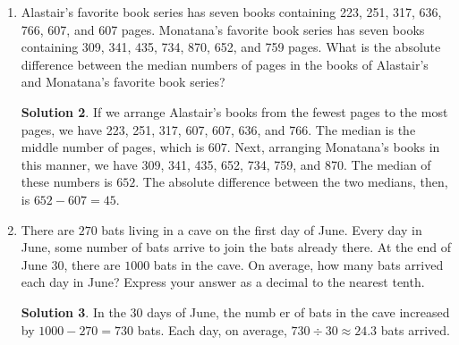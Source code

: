 \documentclass{article}
\theoremstyle{definition}
\newtheorem*{solution}{Solution}
\begin{document}
\begin{enumerate}
\begin{solution}
            there are $\frac{7\cdot6}{2} = 21$ different partnerships possible. The
            probaility is $\frac{12}{21}$.
        \end{solution}
        \item Alastair's favorite book series has seven books containing 223, 251, 317, 
        636, 766, 607, and 607 pages. Monatana's favorite book series has seven books 
        containing 309, 341, 435, 734, 870, 652, and 759 pages. What is the absolute
        difference between the median numbers of pages in the books of Alastair's and
        Monatana's favorite book series?
        \begin{solution}
            If we arrange Alastair's books from the fewest pages to the most pages, we
            have 223, 251, 317, 607, 607, 636, and 766. The median is the middle number of
            pages, which is $607$. Next, arranging Monatana's books in this manner, we have
            309, 341, 435, 652, 734, 759, and 870. The median of these numbers is $652$.
            The absolute difference between the two medians, then, is $652 - 607 = 45$.
        \end{solution}
        \item There are $270$ bats living in a cave on the first day of June. Every day in
        June, some number of bats arrive to join the bats already there. At the end of June
        30, there are $1000$ bats in the cave. On average, how many bats arrived each day
        in June? Express your answer as a decimal to the nearest tenth.
        \begin{solution}
            In the 30 days of June, the numb er of bats in the cave increased by
            $1000 - 270 = 730$ bats. Each day, on average, $730 \div 30 \approx 24.3$
            bats arrived.
        \end{solution}
    \end{enumerate}
\end{document}
